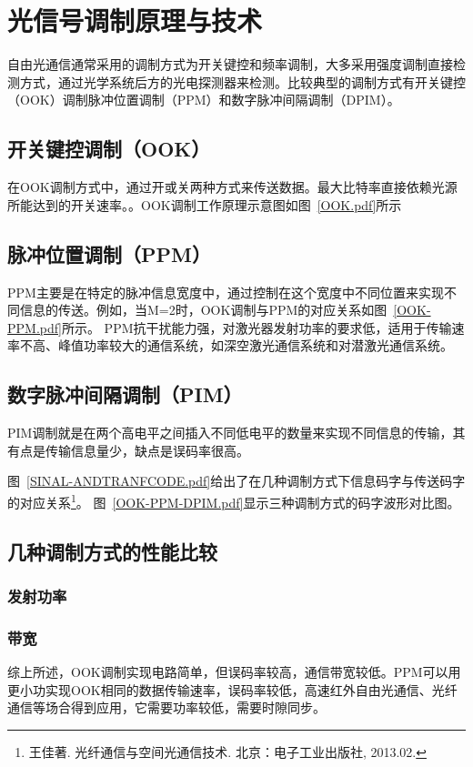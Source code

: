 \chapter{光信号调制原理与技术}
自由光通信通常采用的调制方式为开关键控和频率调制，大多采用强度调制直接检测方式，通过光学系统后方的光电探测器来检测。比较典型的调制方式有开关键控（OOK）调制脉冲位置调制（PPM）和数字脉冲间隔调制（DPIM）。

\section{开关键控调制（OOK）}
在OOK调制方式中，通过开或关两种方式来传送数据。最大比特率直接依赖光源所能达到的开关速率。。OOK调制工作原理示意图如图~\ref{OOK.pdf}所示




\section{脉冲位置调制（PPM）}
PPM主要是在特定的脉冲信息宽度中，通过控制在这个宽度中不同位置来实现不同信息的传送。例如，当M=2时，OOK调制与PPM的对应关系如图~\ref{OOK-PPM.pdf}所示。
PPM抗干扰能力强，对激光器发射功率的要求低，适用于传输速率不高、峰值功率较大的通信系统，如深空激光通信系统和对潜激光通信系统。


\section{数字脉冲间隔调制（PIM）}
PIM调制就是在两个高电平之间插入不同低电平的数量来实现不同信息的传输，其有点是传输信息量少，缺点是误码率很高。

图~\ref{SINAL-ANDTRANFCODE.pdf}给出了在几种调制方式下信息码字与传送码字的对应关系\citep{WJ.2013.02}\footnote{ 王佳著. 光纤通信与空间光通信技术. 北京：电子工业出版社, 2013.02.}。
图~\ref{OOK-PPM-DPIM.pdf}显示三种调制方式的码字波形对比图。

\section{ 几种调制方式的性能比较}
\subsection{发射功率}
\subsection{带宽}
综上所述，OOK调制实现电路简单，但误码率较高，通信带宽较低。PPM可以用更小功实现OOK相同的数据传输速率，误码率较低，高速红外自由光通信、光纤通信等场合得到应用，它需要功率较低，需要时隙同步。




